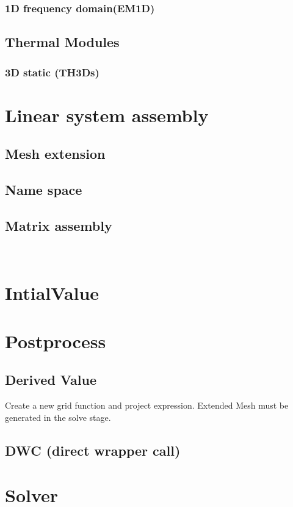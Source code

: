 \documentclass[11pt,a4paper,final]{report}
\begin{document}
\subsection{1D frequency domain(EM1D)}


\section{Thermal Modules}
\subsection{3D static (TH3Ds)}


\chapter{Linear system assembly}
\section{Mesh extension} 
\section{Name space}
\section{Matrix assembly}
\
\chapter{IntialValue}
\label{InitialValue}    

\chapter{Postprocess}
\label{Postprocess}       
\section{Derived Value}     
Create a new grid function and project expression.
Extended Mesh must be generated in the solve stage.

\section{DWC (direct wrapper call)}

\chapter{Solver}
\end{document}
